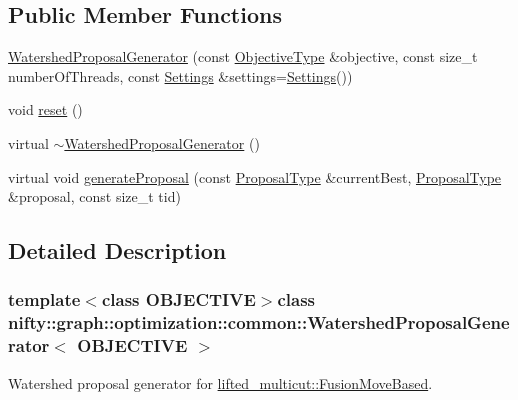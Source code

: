 \subsection*{Public Member Functions}
\begin{DoxyCompactItemize}
\item 
\hyperlink{classnifty_1_1graph_1_1optimization_1_1common_1_1WatershedProposalGenerator_a363dbba1f7231a09d09d376700a1ac6b}{Watershed\+Proposal\+Generator} (const \hyperlink{classnifty_1_1graph_1_1optimization_1_1common_1_1WatershedProposalGenerator_a2de6e9c22ef125106cb152bcc78a9499}{Objective\+Type} \&objective, const size\+\_\+t number\+Of\+Threads, const \hyperlink{structnifty_1_1graph_1_1optimization_1_1common_1_1WatershedProposalGenerator_1_1Settings}{Settings} \&settings=\hyperlink{structnifty_1_1graph_1_1optimization_1_1common_1_1WatershedProposalGenerator_1_1Settings}{Settings}())
\item 
void \hyperlink{classnifty_1_1graph_1_1optimization_1_1common_1_1WatershedProposalGenerator_abf4b3f5ca30d3b05cf6f6d50ac3d7de7}{reset} ()
\item 
virtual \hyperlink{classnifty_1_1graph_1_1optimization_1_1common_1_1WatershedProposalGenerator_aadcf113cf5d11289a53266dca1a3225f}{$\sim$\+Watershed\+Proposal\+Generator} ()
\item 
virtual void \hyperlink{classnifty_1_1graph_1_1optimization_1_1common_1_1WatershedProposalGenerator_a24691eed151a87476d7e5152c2f7b918}{generate\+Proposal} (const \hyperlink{classnifty_1_1graph_1_1optimization_1_1common_1_1ProposalGeneratorBase_a4700eb43beb708a77c5c34612039c715}{Proposal\+Type} \&current\+Best, \hyperlink{classnifty_1_1graph_1_1optimization_1_1common_1_1ProposalGeneratorBase_a4700eb43beb708a77c5c34612039c715}{Proposal\+Type} \&proposal, const size\+\_\+t tid)
\end{DoxyCompactItemize}


\subsection{Detailed Description}
\subsubsection*{template$<$class O\+B\+J\+E\+C\+T\+I\+V\+E$>$class nifty\+::graph\+::optimization\+::common\+::\+Watershed\+Proposal\+Generator$<$ O\+B\+J\+E\+C\+T\+I\+V\+E $>$}

Watershed proposal generator for \hyperlink{classnifty_1_1graph_1_1lifted__multicut_1_1FusionMoveBased}{lifted\+\_\+multicut\+::\+Fusion\+Move\+Based}. 



